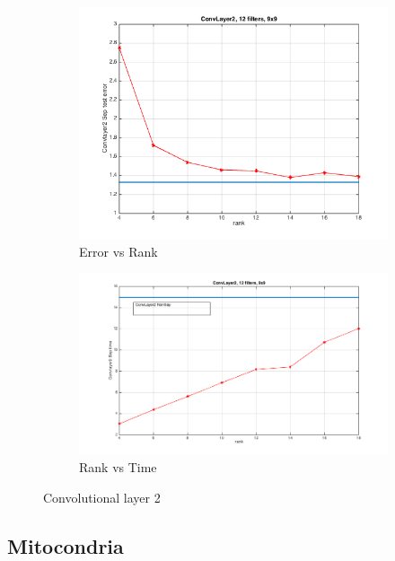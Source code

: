 \documentclass{article} %
\begin{document}
\begin{figure}[h]
  \centering
  \begin{subfigure}[b]{0.40\textwidth}
   \includegraphics[width=\textwidth]{presentation_plots/convL2_error.png}
    \caption{Error vs Rank}
  \end{subfigure}
  \begin{subfigure}[b]{0.40\textwidth}
    \includegraphics[width=\textwidth]{presentation_plots/convL2_time.png}
    \caption{Rank vs Time}
  \end{subfigure}
  \caption{Convolutional layer 2}
  \label{fig:cnn2error}
\end{figure}

\subsection{Mitocondria}
\end{document}
